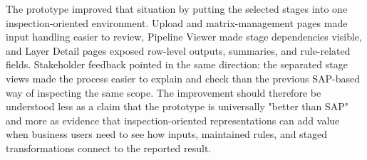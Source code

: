 The prototype improved that situation by putting the selected stages into one inspection-oriented environment. Upload and matrix-management pages made input handling easier to review, Pipeline Viewer made stage dependencies visible, and Layer Detail pages exposed row-level outputs, summaries, and rule-related fields. Stakeholder feedback pointed in the same direction: the separated stage views made the process easier to explain and check than the previous SAP-based way of inspecting the same scope. The improvement should therefore be understood less as a claim that the prototype is universally "better than SAP" and more as evidence that inspection-oriented representations can add value when business users need to see how inputs, maintained rules, and staged transformations connect to the reported result.





